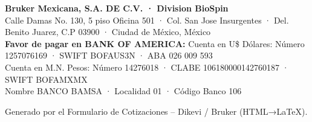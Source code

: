 \documentclass[12pt,spanish]{scrartcl}
\begin{document}
\vspace{1ex}
\footnotesize
\noindent
\textbf{Bruker Mexicana, S.A. DE C.V. · Division BioSpin}\\
Calle Damas No. 130, 5 piso Oficina 501 · Col. San Jose Insurgentes · Del. Benito Juarez, C.P 03900 · Ciudad de México, México\\[0.5ex]
\textbf{Favor de pagar en BANK OF AMERICA:} Cuenta en U\$ Dólares: Número 1257076169 · SWIFT BOFAUS3N · ABA 026 009 593\\
Cuenta en M.N. Pesos: Número 14276018 · CLABE 106180000142760187 · SWIFT BOFAMXMX\\
Nombre BANCO BAMSA · Localidad 01 · Código Banco 106

\vfill
\noindent\scriptsize Generado por el Formulario de Cotizaciones – Dikevi / Bruker (HTML→LaTeX).
\end{document}
